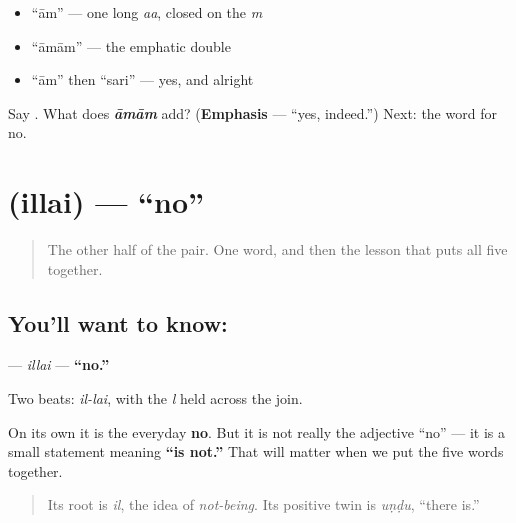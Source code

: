 \begin{itemize}
\raggedright
  \item \textquotedblleft{}ām\textquotedblright{} — one long \emph{aa}, closed on the \emph{m}
  \item \textquotedblleft{}āmām\textquotedblright{} — the emphatic double
  \item \textquotedblleft{}ām\textquotedblright{} then \textquotedblleft{}sari\textquotedblright{} — yes, and alright
\end{itemize}

\begin{tcolorbox}[breakable,colback=teal!4,colframe=teal!35!black,title={Before you move on}]
Say \textbf{}. What does \emph{\textbf{āmām}} add? (\textbf{Emphasis} — \textquotedblleft{}yes, indeed.\textquotedblright{}) Next: the word for no.
\end{tcolorbox}
\section[\texorpdfstring{\ta{இல்லை} (illai)}{இல்லை (illai)}]{ (illai) — \textquotedblleft{}no\textquotedblright{}}

\label{lesson:TA-C01-illai}



\begin{quote}
The other half of the pair. One word, and then the lesson that puts all five together.
\end{quote}

\subsection*{You'll want to know: }
\textbf{} — \emph{illai} — \textbf{\textquotedblleft{}no.\textquotedblright{}}

Two beats: \emph{il-lai}, with the \emph{l} held across the join.

On its own it is the everyday \textbf{no}. But it is not really the adjective \textquotedblleft{}no\textquotedblright{} — it is a small statement meaning \textbf{\textquotedblleft{}is not.\textquotedblright{}} That will matter when we put the five words together.

\begin{quote}
Its root is \emph{il}, the idea of \emph{not-being}. Its positive twin is \emph{uṇḍu}, \textquotedblleft{}there is.\textquotedblright{}
\end{quote}

